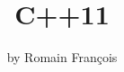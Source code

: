 \title{C++11}
\author{by Romain Fran\c{c}ois}

\maketitle

\abstract{}



\address{Romain Fran\c{c}ois\\
    R Enthusiasts\\
    1 place de l'\'egalit\'e. 42400 Saint Chamond\\
    FRANCE }
    

